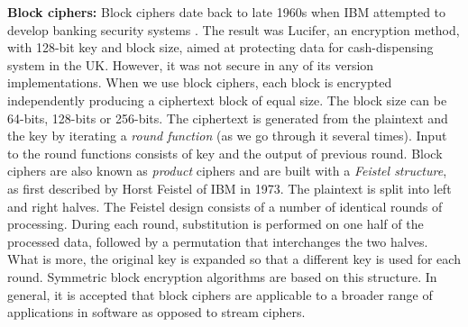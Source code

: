 \textbf{Block ciphers:} Block ciphers date back to late 1960s when IBM attempted to develop banking security systems \cite{ibmcrypto}. The result was Lucifer, an encryption method, with 128-bit key and block size, aimed at protecting data for cash-dispensing system in the UK. However, it was not secure in any of its version implementations. 
When we use block ciphers, each block is encrypted independently producing a ciphertext block of equal size. The block size can be 64-bits, 128-bits or 256-bits. The ciphertext is generated from the plaintext and the key by iterating a \emph{round function} (as we go through it several times). Input to the round functions consists of key and the output of previous round. Block ciphers are also known as \emph{product} ciphers and are built with a \emph{Feistel structure}, as first described by Horst Feistel of IBM in 1973. The plaintext is split into left and right halves. The Feistel design consists of a number of identical rounds of processing. During each round, substitution is performed on one half of the processed data, followed by a permutation that interchanges the two halves. What is more, the original key is expanded so that a different key is used for each round. Symmetric block encryption algorithms are based on this structure. In general, it is accepted that block ciphers are applicable to a broader range of applications in software as opposed to stream ciphers.

